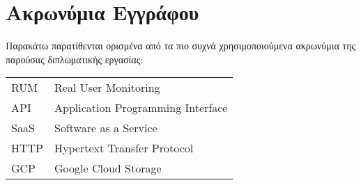 \chapter*{Ακρωνύμια Εγγράφου}
\label{append:acronyms}
{}

Παρακάτω παρατίθενται ορισμένα από τα πιο συχνά χρησιμοποιούμενα ακρωνύμια της
παρούσας διπλωματικής εργασίας:

\begin{table}[htpb]
  \centering
  \begin{tabular}{l@{$\;\;\longrightarrow\;\;$}l}
	RUM & Real User Monitoring \\
  API & Application Programming Interface \\
  SaaS & Software as a Service \\
  HTTP & Hypertext Transfer Protocol \\
  GCP & Google Cloud Storage \\
  \end{tabular}
\end{table}